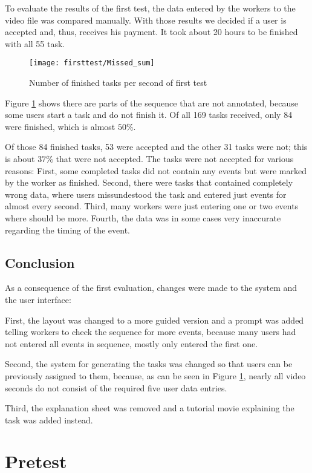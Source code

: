 To evaluate the results of the first test, the data entered by the workers to the video file was compared manually.
With those results we decided if a user is accepted and, thus, receives his payment.
It took about 20 hours to be finished with all 55 task.

\begin{figure}[H]
    \centering
    \texttt{[image: firsttest/Missed\_sum]}
    \caption{Number of finished tasks per second of first test}
    \label{fig:MissedSum}
\end{figure}

Figure \ref{fig:MissedSum} shows there are parts of the sequence that are not annotated, because some users start a task and do not finish it. Of all 169 tasks received, only 84 were finished, which is almost $50\%$.

Of those 84 finished tasks, 53 were accepted and the other 31 tasks were not; this is about $37\%$ that were not accepted.
The tasks were not accepted for various reasons: First, some completed tasks did not contain any events but were marked by the worker as finished. Second, there were tasks that contained completely wrong data, where users missundestood the task and entered just events for almost every second. Third, many workers were just entering one or two events where should be more. Fourth, the data was in some cases very inaccurate regarding the timing of the event.

\subsection{Conclusion}

As a consequence of the first evaluation, changes were made to the system and the user interface: 

First, the layout was changed to a more guided version and a prompt was added telling workers to check the sequence for more events, because many users had not entered all events in sequence, mostly only entered the first one.

Second, the system for generating the tasks was changed so that users can be previously assigned to them, because, as can be seen in Figure \ref{fig:MissedSum}, nearly all video seconds do not consist of the required five user data entries.

Third, the explanation sheet was removed and a tutorial movie explaining the task was added instead.

\newpage
\section{Pretest}\label{sec:pretest}

